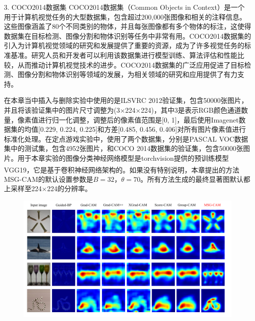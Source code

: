 3. COCO2014数据集
COCO2014数据集（Common Objects in Context）是一个用于计算机视觉任务的大型数据集，包含超过200,000张图像和相关的注释信息。这些图像涵盖了80个不同类别的物体，并且每张图像都有多个物体的标注，这使得数据集在目标检测、图像分割和物体识别等任务中非常有用。COCO2014数据集的引入为计算机视觉领域的研究和发展提供了重要的资源，成为了许多视觉任务的标准基准。研究人员和开发者可以利用该数据集进行模型训练、算法评估和性能比较，从而推动计算机视觉技术的进步。COCO2014数据集的广泛应用促进了目标检测、图像分割和物体识别等领域的发展，为相关领域的研究和应用提供了有力支持。

在本章当中插入与删除实验中使用的是ILSVRC 2012验证集，包含50000张图片，并且将该验证集中的图片尺寸调整为(3$\times$224$\times$224)，其中$3$是表示RGB颜色通道数量，像素值进行归一化调整，调整后的像素值范围是[0, 1]，最后使用Imagenet数据集的均值[0.229, 0.224, 0.225]和方差[0.485, 0.456, 0.406]对所有图片像素值进行标准化处理。在定点游戏实验中，使用了两个数据集，分别是PASCAL VOC数据集中的测试集，包含4952张图片，和COCO 2014数据集的验证集，包含50000张图片。用于本章实验的图像分类神经网络模型是torchvision提供的预训练模型VGG19\textsuperscript{\cite{simonyan2014very}}，它是基于卷积神经网络架构的。如果没有特别说明，本章提出的方法MSG-CAM的默认设置参数是$B=32$，$\theta=70$。所有方法生成的最终显著图默认都上采样至224$\times$224的分辨率。

\begin{figure}[h]
	\centering 
	\includegraphics[width=15cm]{fig/ch3/msgContrast.pdf}
	\label{fig:msgContrast}
\end{figure}

